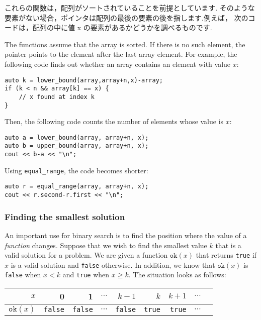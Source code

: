 これらの関数は，配列がソートされていることを前提としています.
そのような要素がない場合，ポインタは配列の最後の要素の後を指します.例えば， 次のコードは，配列の中に値 x の要素があるかどうかを調べるものです.

The functions assume that the array is sorted.
If there is no such element, the pointer points to
the element after the last array element.
For example, the following code finds out whether
an array contains an element with value $x$:

\begin{lstlisting}
auto k = lower_bound(array,array+n,x)-array;
if (k < n && array[k] == x) {
    // x found at index k
}
\end{lstlisting}

Then, the following code counts the number of elements
whose value is $x$:

\begin{lstlisting}
auto a = lower_bound(array, array+n, x);
auto b = upper_bound(array, array+n, x);
cout << b-a << "\n";
\end{lstlisting}

Using \texttt{equal\_range}, the code becomes shorter:

\begin{lstlisting}
auto r = equal_range(array, array+n, x);
cout << r.second-r.first << "\n";
\end{lstlisting}

\subsubsection{Finding the smallest solution}

An important use for binary search is
to find the position where the value of a \emph{function} changes.
Suppose that we wish to find the smallest value $k$
that is a valid solution for a problem.
We are given a function $\texttt{ok}(x)$
that returns \texttt{true} if $x$ is a valid solution
and \texttt{false} otherwise.
In addition, we know that $\texttt{ok}(x)$ is \texttt{false}
when $x<k$ and \texttt{true} when $x \ge k$.
The situation looks as follows:

\begin{center}
\begin{tabular}{r|rrrrrrrr}
$x$ & 0 & 1 & $\cdots$ & $k-1$ & $k$ & $k+1$ & $\cdots$ \\
\hline
$\texttt{ok}(x)$ & \texttt{false} & \texttt{false}
& $\cdots$ & \texttt{false} & \texttt{true} & \texttt{true} & $\cdots$ \\
\end{tabular}
\end{center}

